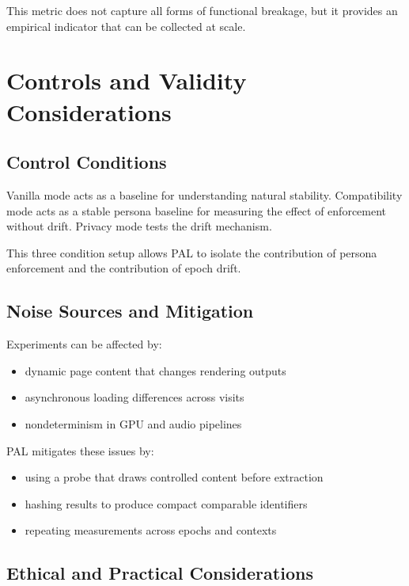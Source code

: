 \documentclass[11pt]{report}
\begin{document}
This metric does not capture all forms of functional breakage, but it provides an empirical indicator that can be collected at scale.

\section{Controls and Validity Considerations}

\subsection{Control Conditions}

Vanilla mode acts as a baseline for understanding natural stability. Compatibility mode acts as a stable persona baseline for measuring the effect of enforcement without drift. Privacy mode tests the drift mechanism.

This three condition setup allows PAL to isolate the contribution of persona enforcement and the contribution of epoch drift.

\subsection{Noise Sources and Mitigation}

Experiments can be affected by:

\begin{itemize}
    \item dynamic page content that changes rendering outputs
    \item asynchronous loading differences across visits
    \item nondeterminism in GPU and audio pipelines
\end{itemize}

PAL mitigates these issues by:

\begin{itemize}
    \item using a probe that draws controlled content before extraction
    \item hashing results to produce compact comparable identifiers
    \item repeating measurements across epochs and contexts
\end{itemize}

\subsection{Ethical and Practical Considerations}
\end{document}
